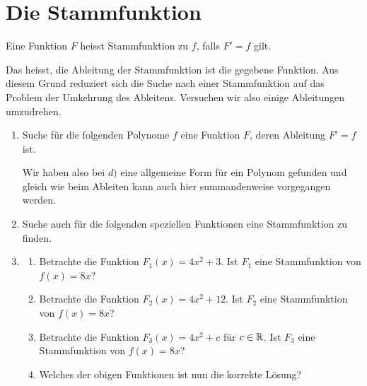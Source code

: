 \documentclass[11pt,oneside]{article}
\begin{document}
\section{Die Stammfunktion}
	\begin{definition}[Stammfunktion]
		Eine Funktion $F$ heisst Stammfunktion zu $f$, falls $F'=f$ gilt.
	\end{definition}
	Das heisst, die Ableitung der Stammfunktion ist die gegebene Funktion. Aus diesem Grund reduziert sich die Suche nach einer Stammfunktion auf das Problem der Umkehrung des Ableitens. Versuchen wir also einige Ableitungen umzudrehen.
	\begin{aufgabe}
		\begin{enumerate}
			\item Suche für die folgenden Polynome $f$ eine Funktion $F$, deren Ableitung $F'=f$ ist.
			Wir haben also bei $d)$ eine allgemeine Form für ein Polynom gefunden und gleich wie beim Ableiten kann auch hier summandenweise vorgegangen werden.
			\item Suche auch für die folgenden speziellen Funktionen eine Stammfunktion zu finden.
			\item \begin{enumerate}[label=\alph*)]
				\item Betrachte die Funktion $F_1(x)=4x^2+3$. Ist $F_1$ eine Stammfunktion von $f(x)=8x$?
				\item Betrachte die Funktion $F_2(x)=4x^2+12$. Ist $F_2$ eine Stammfunktion von $f(x)=8x$?
				\item Betrachte die Funktion $F_3(x)=4x^2+c$ für $c\in\mathbb{R}$. Ist $F_3$ eine Stammfunktion von $f(x)=8x$?
				\item Welches der obigen Funktionen ist nun die korrekte Lösung?
			\end{enumerate}
		\end{enumerate}
	\end{aufgabe}
\end{document}

